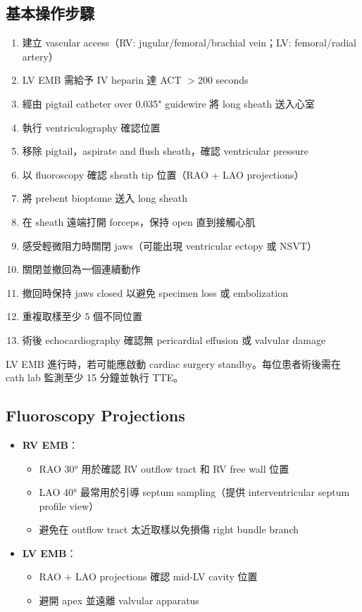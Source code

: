 \documentclass[12pt,a4paper]{article}
\newcommand{\note}[1]{
    \par
    \noindent
    \begin{tcolorbox}[
        colback=emergency_blue!5!white,
        colframe=emergency_blue,
        title=\textbf{重點提醒},
        fonttitle=\bfseries,
        boxrule=0.5pt,
        arc=3pt,
        left=6pt,
        right=6pt,
        top=6pt,
        bottom=6pt
    ]
    #1
    \end{tcolorbox}
}
\begin{document}
\subsection{基本操作步驟}

\begin{enumerate}
    \item 建立 vascular access（RV: jugular/femoral/brachial vein；LV: femoral/radial artery）
    \item LV EMB 需給予 IV heparin 達 ACT $>$200 seconds
    \item 經由 pigtail catheter over 0.035" guidewire 將 long sheath 送入心室
    \item 執行 ventriculography 確認位置
    \item 移除 pigtail，aspirate and flush sheath，確認 ventricular pressure
    \item 以 fluoroscopy 確認 sheath tip 位置（RAO + LAO projections）
    \item 將 prebent bioptome 送入 long sheath
    \item 在 sheath 遠端打開 forceps，保持 open 直到接觸心肌
    \item 感受輕微阻力時關閉 jaws（可能出現 ventricular ectopy 或 NSVT）
    \item 關閉並撤回為一個連續動作
    \item 撤回時保持 jaws closed 以避免 specimen loss 或 embolization
    \item 重複取樣至少 5 個不同位置
    \item 術後 echocardiography 確認無 pericardial effusion 或 valvular damage
\end{enumerate}

\note{
LV EMB 進行時，若可能應啟動 cardiac surgery standby。每位患者術後需在 cath lab 監測至少 15 分鐘並執行 TTE。
}

\subsection{Fluoroscopy Projections}

\begin{itemize}
    \item \textbf{RV EMB}：
    \begin{itemize}
        \item RAO 30° 用於確認 RV outflow tract 和 RV free wall 位置
        \item LAO 40° 最常用於引導 septum sampling（提供 interventricular septum profile view）
        \item 避免在 outflow tract 太近取樣以免損傷 right bundle branch
    \end{itemize}
    \item \textbf{LV EMB}：
    \begin{itemize}
        \item RAO + LAO projections 確認 mid-LV cavity 位置
        \item 避開 apex 並遠離 valvular apparatus
    \end{itemize}
\end{itemize}
\end{document}
